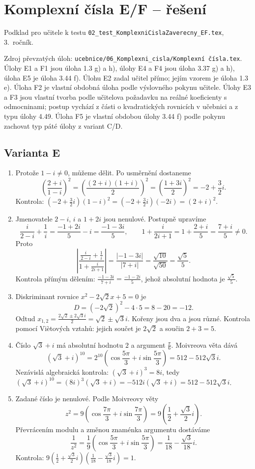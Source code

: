 \documentclass[a4paper,10pt]{article}
\begin{document}
\section*{Komplexní čísla E/F -- řešení}
Podklad pro učitele k testu \texttt{02\_test\_KomplexniCislaZaverecny\_EF.tex}, 3.~ročník.

Zdroj převzatých úloh: \texttt{ucebnice/06\_Komplexni\_cisla/Komplexní čísla.tex}.
Úlohy E1 a F1 jsou úloha 1.3 g) a h), úlohy E4 a F4 jsou úloha 3.37 g) a h),
úloha E5 je úloha 3.44 f). Úlohu E2 zadal učitel přímo; jejím vzorem je úloha
1.3 e). Úloha F2 je vlastní obdobná úloha podle výslovného pokynu učitele.
Úlohy E3 a F3 jsou vlastní tvorba podle učitelova požadavku na reálné
koeficienty s odmocninami; postup vychází z části o kvadratických rovnicích
v učebnici a z typu úlohy 4.49. Úloha F5 je vlastní obdobou úlohy 3.44 f)
podle pokynu zachovat typ páté úlohy z variant C/D.

\subsection*{Varianta E}
\begin{enumerate}
\item Protože $1-i\ne0$, můžeme dělit. Po usměrnění dostaneme
\[
\left(\frac{2+i}{1-i}\right)^2
=\left(\frac{(2+i)(1+i)}2\right)^2
=\left(\frac{1+3i}{2}\right)^2
=-2+\frac32i.
\]
Kontrola: $\left(-2+\frac32i\right)(1-i)^2
=\left(-2+\frac32i\right)(-2i)=(2+i)^2$.

\item Jmenovatele $2-i$, $i$ a $1+2i$ jsou nenulové. Postupně upravíme
\[
\frac{i}{2-i}+\frac1i
=\frac{-1+2i}{5}-i=\frac{-1-3i}{5},
\qquad
1+\frac{i}{2i+1}
=1+\frac{2+i}{5}=\frac{7+i}{5}\ne0.
\]
Proto
\[
\left|\frac{\frac{i}{2-i}+\frac1i}{1+\frac{i}{2i+1}}\right|
=\frac{|-1-3i|}{|7+i|}
=\frac{\sqrt{10}}{\sqrt{50}}
=\frac{\sqrt5}{5}.
\]
Kontrola přímým dělením: $\frac{-1-3i}{7+i}=\frac{-1-2i}{5}$,
jehož absolutní hodnota je $\frac{\sqrt5}{5}$.

\item Diskriminant rovnice $x^2-2\sqrt2x+5=0$ je
\[
D=(-2\sqrt2)^2-4\cdot5=8-20=-12.
\]
Odtud $x_{1,2}=\frac{2\sqrt2\pm2\sqrt3i}{2}
=\sqrt2\pm\sqrt3i$.
Kořeny jsou dva a jsou různé. Kontrola pomocí Viètových vztahů:
jejich součet je $2\sqrt2$ a součin $2+3=5$.

\item Číslo $\sqrt3+i$ má absolutní hodnotu $2$ a argument $\frac\pi6$.
Moivreova věta dává
\[
(\sqrt3+i)^{10}
=2^{10}\left(\cos\frac{5\pi}{3}+i\sin\frac{5\pi}{3}\right)
=512-512\sqrt3i.
\]
Nezávislá algebraická kontrola: $(\sqrt3+i)^3=8i$, tedy
$(\sqrt3+i)^{10}=(8i)^3(\sqrt3+i)
=-512i(\sqrt3+i)=512-512\sqrt3i$.

\item Zadané číslo je nenulové. Podle Moivreovy věty
\[
z^2=9\left(\cos\frac{7\pi}{3}+i\sin\frac{7\pi}{3}\right)
=9\left(\frac12+\frac{\sqrt3}{2}i\right).
\]
Převrácením modulu a změnou znaménka argumentu dostáváme
\[
\frac1{z^2}
=\frac19\left(\cos\frac{5\pi}{3}+i\sin\frac{5\pi}{3}\right)
=\frac1{18}-\frac{\sqrt3}{18}i.
\]
Kontrola: $9(\frac12+\frac{\sqrt3}{2}i)
(\frac1{18}-\frac{\sqrt3}{18}i)=1$.
\end{enumerate}
\end{document}
